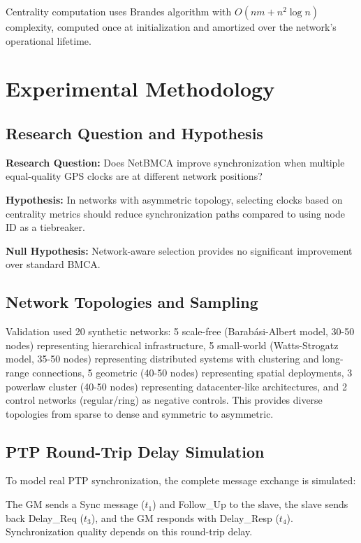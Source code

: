 \documentclass[conference]{IEEEtran}
\begin{document}
Centrality computation uses Brandes algorithm with $O(nm + n^2 \log n)$ complexity, computed once at initialization and amortized over the network's operational lifetime.

\section{Experimental Methodology}

\subsection{Research Question and Hypothesis}

\textbf{Research Question:} Does NetBMCA improve synchronization when multiple equal-quality GPS clocks are at different network positions?

\textbf{Hypothesis:} In networks with asymmetric topology, selecting clocks based on centrality metrics should reduce synchronization paths compared to using node ID as a tiebreaker.

\textbf{Null Hypothesis:} Network-aware selection provides no significant improvement over standard BMCA.

\subsection{Network Topologies and Sampling}

Validation used 20 synthetic networks: 5 scale-free (Barabási-Albert model, 30-50 nodes) representing hierarchical infrastructure, 5 small-world (Watts-Strogatz model, 35-50 nodes) representing distributed systems with clustering and long-range connections, 5 geometric (40-50 nodes) representing spatial deployments, 3 powerlaw cluster (40-50 nodes) representing datacenter-like architectures, and 2 control networks (regular/ring) as negative controls. This provides diverse topologies from sparse to dense and symmetric to asymmetric.

\subsection{PTP Round-Trip Delay Simulation}

To model real PTP synchronization, the complete message exchange is simulated:

The GM sends a Sync message ($t_1$) and Follow\_Up to the slave, the slave sends back Delay\_Req ($t_3$), and the GM responds with Delay\_Resp ($t_4$). Synchronization quality depends on this round-trip delay.
\end{document}
